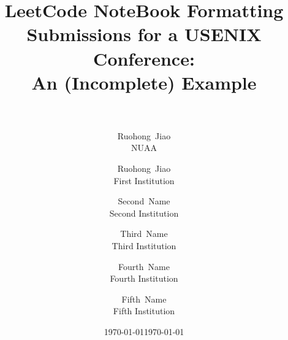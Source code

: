 \ifxetex
\title{\Large\bf LeetCode NoteBook
}
\author{%
	{\rm Ruohong~Jiao}\\
    NUAA
}
\date{\today}
\else
\title{\Large\bf Formatting Submissions for a USENIX Conference:\\
	An (Incomplete) Example\\
	\\
}
\author{%
	{\rm Ruohong~Jiao}\\
	First Institution
	\and
	{\rm Second~Name}\\
	Second Institution
	\and
	{\rm Third~Name}\\
	Third Institution
	\and
	{\rm Fourth~Name}\\
	Fourth Institution
	\and
	{\rm Fifth~Name}\\
	Fifth Institution
}
\date{\today}
\fi
